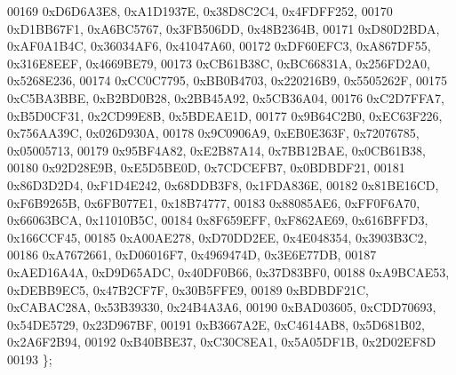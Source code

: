 \begin{DoxyCode}
00169    0xD6D6A3E8, 0xA1D1937E, 0x38D8C2C4, 0x4FDFF252,
00170    0xD1BB67F1, 0xA6BC5767, 0x3FB506DD, 0x48B2364B,
00171    0xD80D2BDA, 0xAF0A1B4C, 0x36034AF6, 0x41047A60,
00172    0xDF60EFC3, 0xA867DF55, 0x316E8EEF, 0x4669BE79,
00173    0xCB61B38C, 0xBC66831A, 0x256FD2A0, 0x5268E236,
00174    0xCC0C7795, 0xBB0B4703, 0x220216B9, 0x5505262F,
00175    0xC5BA3BBE, 0xB2BD0B28, 0x2BB45A92, 0x5CB36A04,
00176    0xC2D7FFA7, 0xB5D0CF31, 0x2CD99E8B, 0x5BDEAE1D,
00177    0x9B64C2B0, 0xEC63F226, 0x756AA39C, 0x026D930A,
00178    0x9C0906A9, 0xEB0E363F, 0x72076785, 0x05005713,
00179    0x95BF4A82, 0xE2B87A14, 0x7BB12BAE, 0x0CB61B38,
00180    0x92D28E9B, 0xE5D5BE0D, 0x7CDCEFB7, 0x0BDBDF21,
00181    0x86D3D2D4, 0xF1D4E242, 0x68DDB3F8, 0x1FDA836E,
00182    0x81BE16CD, 0xF6B9265B, 0x6FB077E1, 0x18B74777,
00183    0x88085AE6, 0xFF0F6A70, 0x66063BCA, 0x11010B5C,
00184    0x8F659EFF, 0xF862AE69, 0x616BFFD3, 0x166CCF45,
00185    0xA00AE278, 0xD70DD2EE, 0x4E048354, 0x3903B3C2,
00186    0xA7672661, 0xD06016F7, 0x4969474D, 0x3E6E77DB,
00187    0xAED16A4A, 0xD9D65ADC, 0x40DF0B66, 0x37D83BF0,
00188    0xA9BCAE53, 0xDEBB9EC5, 0x47B2CF7F, 0x30B5FFE9,
00189    0xBDBDF21C, 0xCABAC28A, 0x53B39330, 0x24B4A3A6,
00190    0xBAD03605, 0xCDD70693, 0x54DE5729, 0x23D967BF,
00191    0xB3667A2E, 0xC4614AB8, 0x5D681B02, 0x2A6F2B94,
00192    0xB40BBE37, 0xC30C8EA1, 0x5A05DF1B, 0x2D02EF8D
00193 \};
\end{DoxyCode}
